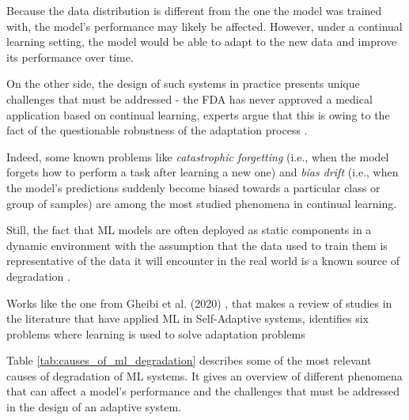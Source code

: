 \documentclass[../main.tex]{subfiles}
\begin{document}
    Because the data distribution is different from the one the model was trained with, the model's performance may likely be affected. However, under a continual learning setting, the model would be able to adapt to the new data and improve its performance over time. 

    
    On the other side, the design of such systems in practice presents unique challenges that must be addressed - the FDA has never approved a medical application based on continual learning, experts argue that this is owing to the fact of the questionable robustness of the adaptation process \cite{vokingerContinualLearningMedical2021}. 
    
    Indeed, some known problems like \textit{catastrophic forgetting} (i.e., when the model forgets how to perform a task after learning a new one) and \textit{bias drift} (i.e., when the model's predictions suddenly become biased towards a particular class or group of samples) are among the most studied phenomena in continual learning.
    
    
    Still, the fact that ML models are often deployed as static components in a dynamic environment with the assumption that the data used to train them is representative of the data it will encounter in the real world is a known source of degradation \cite{vokingerContinualLearningMedical2021}.

    Works like the one from Gheibi et al. (2020) \cite{gheibiApplyingMachineLearning2020}, that makes a review of studies in the literature that have applied ML in Self-Adaptive systems, identifies six problems where learning is used to solve adaptation problems  

    Table \ref{tab:causes_of_ml_degradation} describes some of the most relevant causes of degradation of ML systems. It gives an overview of different phenomena that can affect a model's performance and the challenges that must be addressed in the design of an adaptive system.
\end{document}
